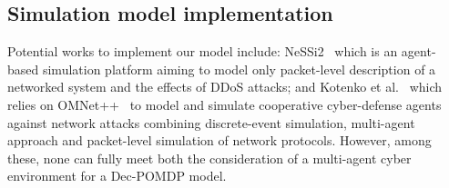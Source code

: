 \begin{enumerate*}[label=\arabic*),itemjoin={;\quad}]

\end{enumerate*}

\subsection{Simulation model implementation}

\noindent
Potential works to implement our model include: NeSSi2~\cite{DGrunewald2011} which is an agent-based simulation platform aiming to model only packet-level description of a networked system and the effects of DDoS attacks; and Kotenko et al.~\cite{IKotenko2007} which relies on OMNet++~\cite{Varga2010} to model and simulate cooperative cyber-defense agents against network attacks combining discrete-event simulation, multi-agent approach and packet-level simulation of network protocols.
However, among these, none can fully meet both the consideration of a multi-agent cyber environment for a Dec-POMDP model.

